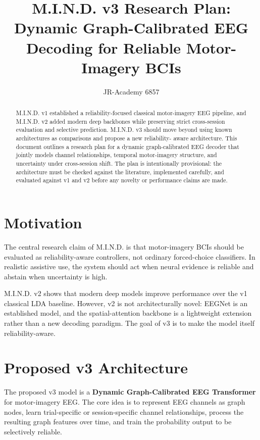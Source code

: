 \documentclass[11pt]{article}
\title{M.I.N.D. v3 Research Plan: Dynamic Graph-Calibrated EEG Decoding for Reliable Motor-Imagery BCIs}
\author{JR-Academy 6857}
\date{}
\begin{document}
\maketitle

\begin{abstract}
M.I.N.D. v1 established a reliability-focused classical motor-imagery EEG
pipeline, and M.I.N.D. v2 added modern deep backbones while preserving strict
cross-session evaluation and selective prediction. M.I.N.D. v3 should move
beyond using known architectures as comparisons and propose a new reliability-
aware architecture. This document outlines a research plan for a dynamic
graph-calibrated EEG decoder that jointly models channel relationships,
temporal motor-imagery structure, and uncertainty under cross-session shift.
The plan is intentionally provisional: the architecture must be checked against
the literature, implemented carefully, and evaluated against v1 and v2 before
any novelty or performance claims are made.
\end{abstract}

\section{Motivation}

The central research claim of M.I.N.D. is that motor-imagery BCIs should be
evaluated as reliability-aware controllers, not ordinary forced-choice
classifiers. In realistic assistive use, the system should act when neural
evidence is reliable and abstain when uncertainty is high.

M.I.N.D. v2 shows that modern deep models improve performance over the v1
classical LDA baseline. However, v2 is not architecturally novel: EEGNet is an
established model, and the spatial-attention backbone is a lightweight
extension rather than a new decoding paradigm. The goal of v3 is to make the
model itself reliability-aware.

\section{Proposed v3 Architecture}

The proposed v3 model is a \textbf{Dynamic Graph-Calibrated EEG Transformer}
for motor-imagery EEG. The core idea is to represent EEG channels as graph
nodes, learn trial-specific or session-specific channel relationships, process
the resulting graph features over time, and train the probability output to be
selectively reliable.
\end{document}
